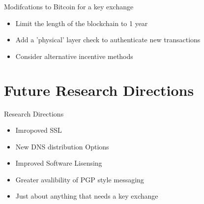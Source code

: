 \documentclass{beamer}
\begin{document}
\begin{frame}{Modifcations to Bitcoin for a key exchange}
\begin{itemize}
	\item{Limit the length of the blockchain to 1 year}
	\item{Add a 'physical' layer check to authenticate new transactions}
	\item{Consider alternative incentive methods}
\end{itemize}
\end{frame}

\section{Future Research Directions}

\begin{frame}{Research Directions}
\begin{itemize}
	\item{Imropoved SSL}
	\item{New DNS distribution Options}
	\item{Improved Software Lisensing}
	\item{Greater avalibility of PGP style messaging}
	\item{Just about anything that needs a key exchange}
	
\end{itemize}


\end{frame}
\end{document}
